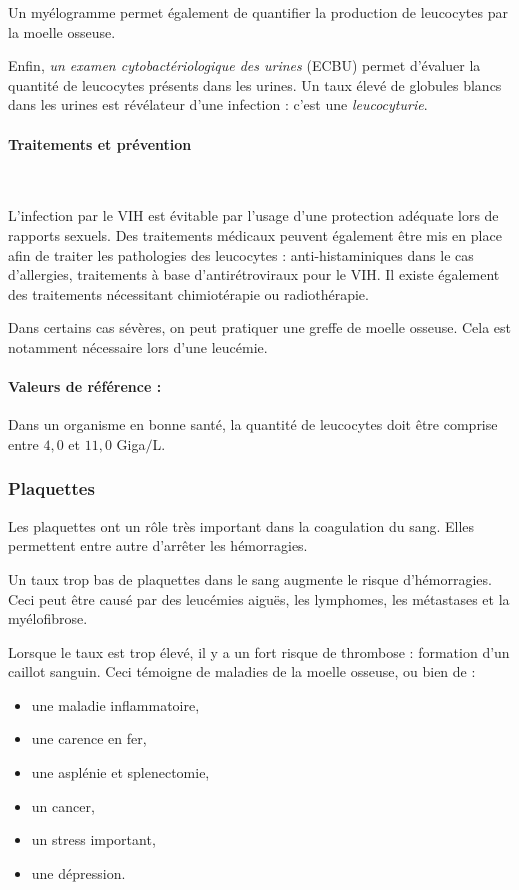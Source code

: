 \documentclass[12pt]{article}
\begin{document}
	Un myélogramme permet également de quantifier la production de leucocytes par la moelle osseuse.
	
	Enfin, \textit{un examen cytobactériologique des urines} (ECBU) permet d'évaluer la quantité de leucocytes présents dans les urines. Un taux élevé de globules blancs dans les urines est révélateur d'une infection : c'est une \textit{leucocyturie}.
	
		\paragraph{Traitements et prévention}\mbox{~}
		
	L'infection par le VIH est évitable par l'usage d'une protection adéquate lors de rapports sexuels. Des traitements médicaux peuvent également être mis en place afin de traiter les pathologies des leucocytes : anti-histaminiques dans le cas d'allergies, traitements à base d'antirétroviraux pour le VIH. Il existe également des traitements nécessitant chimiotérapie ou radiothérapie.
	
	Dans certains cas sévères, on peut pratiquer une greffe de moelle osseuse. Cela est notamment nécessaire lors d'une leucémie.
	
		\paragraph{Valeurs de référence :}
	Dans un organisme en bonne santé, la quantité de leucocytes doit être comprise entre $4,0$ et $11,0$ Giga$/$L.
	
	\subsubsection{Plaquettes}
	Les plaquettes ont un rôle très important dans la coagulation du sang. Elles permettent entre autre d'arrêter les hémorragies.
	
	Un taux trop bas de plaquettes dans le sang augmente le risque d'hémorragies. Ceci peut être causé par des leucémies aiguës, les lymphomes, les métastases et la myélofibrose. 
	
	Lorsque le taux est trop élevé, il y a un fort risque de thrombose : formation d'un caillot sanguin. Ceci témoigne de maladies de la moelle osseuse, ou bien de :
	\begin{itemize}
	\item une maladie inflammatoire,
	\item une carence en fer,
	\item une asplénie et splenectomie,
	\item un cancer,
	\item un stress important,
	\item une dépression.
	\end{itemize}		
	
\end{document}
